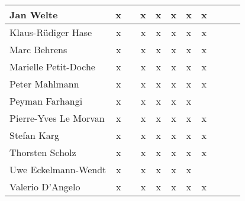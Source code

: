 \documentclass[a4paper, 11pt]{article}
\begin{document}
\begin{tabular}{|l|c|c|c|c||c|c|c||c|c|c|}
Jan Welte            &  x &  &x  & x & x & x  & x  \\\hline
Klaus-R\"udiger Hase &  x &   &x  & x & x & x & x \\\hline
Marc Behrens         & x   &   & x & x & x & x & x \\\hline
Marielle Petit-Doche & x  &   & x  & x & x & x & x \\\hline
Peter Mahlmann       & x &  & x & x & x & x & x \\\hline
Peyman Farhangi      & x &   & x & x & x & x &   \\\hline
Pierre-Yves Le Morvan & x  &  & x & x & x &  x & x  \\\hline
Stefan Karg          & x  &  & x & x & x & x & x \\\hline
Thorsten Scholz      &  x &   & x & x & x & x & x \\\hline
Uwe Eckelmann-Wendt         & x  &  & x & x & x & x &  \\\hline
Valerio D'Angelo     &  x &   &x   & x  & x & x & x \\\hline
\end{tabular}
\end{document}
